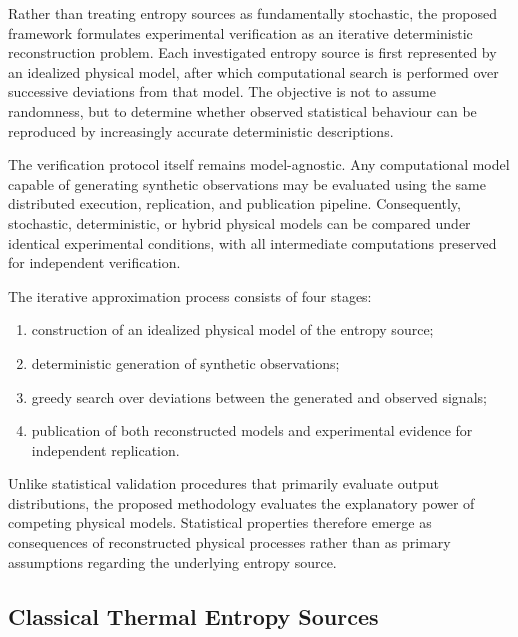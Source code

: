 \documentclass[11pt]{article}
\begin{document}
Rather than treating entropy sources as fundamentally stochastic,
the proposed framework formulates experimental verification
as an iterative deterministic reconstruction problem.
Each investigated entropy source is first represented by an idealized
physical model, after which computational search is performed over
successive deviations from that model.
The objective is not to assume randomness,
but to determine whether observed statistical behaviour can be reproduced
by increasingly accurate deterministic descriptions.

The verification protocol itself remains model-agnostic.
Any computational model capable of generating synthetic observations
may be evaluated using the same distributed execution,
replication,
and publication pipeline.
Consequently,
stochastic,
deterministic,
or hybrid physical models can be compared under identical experimental
conditions,
with all intermediate computations preserved for independent verification.

The iterative approximation process consists of four stages:

\begin{enumerate}

\item construction of an idealized physical model of the entropy source;

\item deterministic generation of synthetic observations;

\item greedy search over deviations between the generated and observed
signals;

\item publication of both reconstructed models and experimental evidence
for independent replication.

\end{enumerate}

Unlike statistical validation procedures that primarily evaluate output
distributions,
the proposed methodology evaluates the explanatory power of competing
physical models.
Statistical properties therefore emerge as consequences of reconstructed
physical processes rather than as primary assumptions regarding the
underlying entropy source.


\subsection{Classical Thermal Entropy Sources}
\end{document}
